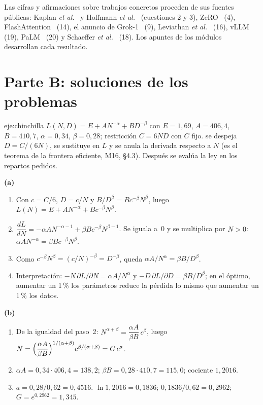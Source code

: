 Las cifras y afirmaciones sobre trabajos concretos proceden de sus fuentes públicas: Kaplan \emph{et al.}~\cite{kaplan} y Hoffmann \emph{et al.}~\cite{hoffmann} (cuestiones 2 y 3), ZeRO~\cite{zero} (4), FlashAttention~\cite{flash} (14), el anuncio de Grok-1~\cite{grok1} (9), Leviathan \emph{et al.}~\cite{leviathan} (16), vLLM~\cite{vllm} (19), PaLM~\cite{palm} (20) y Schaeffer \emph{et al.}~\cite{schaeffer} (18). Los apuntes de los módulos~\cite{apuntes} desarrollan cada resultado.

\section{Parte B: soluciones de los problemas}

\begin{solucion}{eje:chinchilla}
\datos $L(N,D)=E+AN^{-\alpha}+BD^{-\beta}$ con $E=1{,}69$, $A=406{,}4$, $B=410{,}7$, $\alpha=0{,}34$, $\beta=0{,}28$; restricción $C=6ND$ con $C$ fijo.
\planteamiento se despeja $D=C/(6N)$, se sustituye en $L$ y se anula la derivada respecto a $N$ (es el teorema de la frontera eficiente, M16, §4.3). Después se evalúa la ley en los repartos pedidos.
\pasos

\noindent\textbf{(a)}
\begin{enumerate}[label=\arabic*.]
  \item Con $c=C/6$, $D=c/N$ y $B/D^{\beta}=Bc^{-\beta}N^{\beta}$, luego $L(N)=E+AN^{-\alpha}+Bc^{-\beta}N^{\beta}$.
  \item $\dfrac{dL}{dN}=-\alpha AN^{-\alpha-1}+\beta Bc^{-\beta}N^{\beta-1}$. Se iguala a~0 y se multiplica por $N>0$: $\alpha AN^{-\alpha}=\beta Bc^{-\beta}N^{\beta}$.
  \item Como $c^{-\beta}N^{\beta}=(c/N)^{-\beta}=D^{-\beta}$, queda $\alpha A/N^{\alpha}=\beta B/D^{\beta}$.
  \item Interpretación: $-N\,\partial L/\partial N=\alpha A/N^{\alpha}$ y $-D\,\partial L/\partial D=\beta B/D^{\beta}$; en el óptimo, aumentar un 1\,\% los parámetros reduce la pérdida lo mismo que aumentar un 1\,\% los datos.
\end{enumerate}

\noindent\textbf{(b)}
\begin{enumerate}[label=\arabic*.]
  \item De la igualdad del paso~2: $N^{\alpha+\beta}=\dfrac{\alpha A}{\beta B}\,c^{\beta}$, luego $N=\Bigl(\dfrac{\alpha A}{\beta B}\Bigr)^{1/(\alpha+\beta)}c^{\beta/(\alpha+\beta)}=G\,c^{a}$.
  \item $\alpha A=0{,}34\cdot 406{,}4=138{,}2$; $\beta B=0{,}28\cdot 410{,}7=115{,}0$; cociente $1{,}2016$.
  \item $a=0{,}28/0{,}62=0{,}4516$. $\ln 1{,}2016=0{,}1836$; $0{,}1836/0{,}62=0{,}2962$; $G=e^{0{,}2962}=1{,}345$.
\end{enumerate}


\end{solucion}

